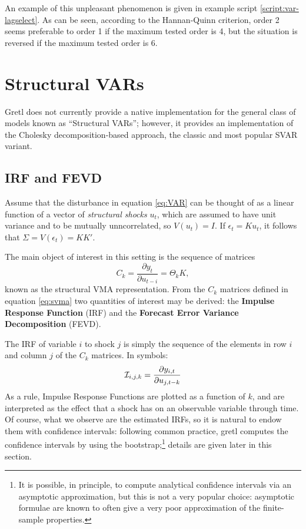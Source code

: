 An example of this unpleasant phenomenon is given in example script
\ref{script:var-lagselect}. As can be seen, according to the
Hannan-Quinn criterion, order 2 seems preferable to order 1 if the
maximum tested order is 4, but the situation is reversed if the
maximum tested order is 6.

\section{Structural VARs}
\label{sec:svar}

Gretl does not currently provide a native implementation for the
general class of models known as ``Structural VARs''; however, it
provides an implementation of the Cholesky decomposition-based
approach, the classic and most popular SVAR variant.

\subsection{IRF and FEVD}

Assume that the disturbance in equation \eqref{eq:VAR} can be thought
of as a linear function of a vector of \emph{structural shocks} $u_t$,
which are assumed to have unit variance and to be mutually
unncorrelated, so $V(u_t) = I$. If $\epsilon_t = K u_t$, it follows
that $\Sigma = V(\epsilon_t) = KK'$.

The main object of interest in this setting is the sequence of
matrices
\begin{equation}
  \label{eq:svma}
  C_k = \frac{\partial y_t}{\partial u_{t-i}} = \Theta_k K, 
\end{equation}
known as the structural VMA representation. From the $C_k$ matrices
defined in equation \eqref{eq:svma} two quantities of interest may be
derived: the \textbf{Impulse Response Function} (IRF) and the
\textbf{Forecast Error Variance Decomposition} (FEVD).

The IRF of variable $i$ to shock $j$ is simply the sequence of the
elements in row $i$ and column $j$ of the $C_k$ matrices. In symbols:
\[
  \mathcal{I}_{i,j,k} = \frac{\partial y_{i,t}}{\partial u_{j, t-k}}
\]
As a rule, Impulse Response Functions are plotted as a function of
$k$, and are interpreted as the effect that a shock has on an
observable variable through time. Of course, what we observe are the
estimated IRFs, so it is natural to endow them with confidence
intervals: following common practice, gretl computes the
confidence intervals by using the bootstrap;\footnote{It is possible,
  in principle, to compute analytical confidence intervals via an
  asymptotic approximation, but this is not a very popular choice:
  asymptotic formulae are known to often give a very poor
  approximation of the finite-sample properties.} details are given
later in this section.

